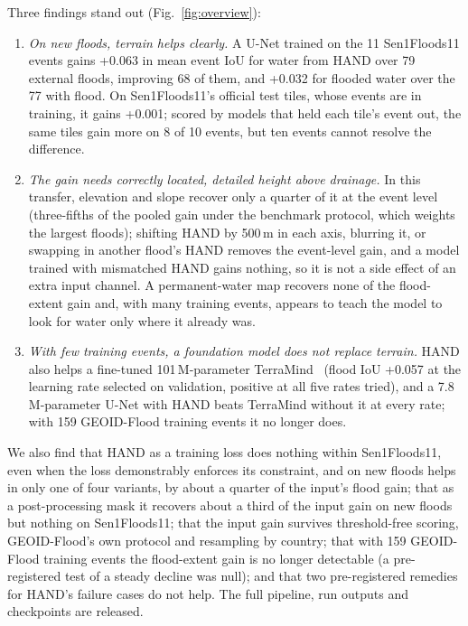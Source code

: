 Three findings stand out (Fig.~\ref{fig:overview}):
\begin{enumerate}
\item \emph{On new floods, terrain helps clearly.} A U-Net trained on the 11 Sen1Floods11 events gains
+0.063 in mean event IoU for water from HAND over 79 external floods, improving 68 of them, and +0.032 for
flooded water over the 77 with flood. On Sen1Floods11's official test tiles, whose events are in training,
it gains +0.001; scored by models that held each tile's event out, the same tiles gain more on 8 of 10
events, but ten events cannot resolve the difference.
\item \emph{The gain needs correctly located, detailed height above drainage.} In this transfer, elevation
and slope recover only a quarter of it at the event level (three-fifths of the pooled gain under the
benchmark protocol, which weights the largest floods); shifting HAND by 500\,m in each axis,
blurring it, or swapping in another flood's HAND removes the event-level gain, and a model trained with mismatched HAND gains nothing, so it
is not a side effect of an extra input channel. A permanent-water map recovers none of the flood-extent
gain and, with many training events, appears to teach the model to look for water only where it already was.
\item \emph{With few training events, a foundation model does not replace terrain.}
HAND also helps a fine-tuned 101\,M-parameter TerraMind~\cite{jakubik2025terramind} (flood IoU +0.057 at
the learning rate selected on validation, positive at all five rates tried), and a 7.8\,M-parameter U-Net
with HAND beats TerraMind without it at every rate; with 159 GEOID-Flood training events it no longer does.
\end{enumerate}

We also find that HAND as a training loss does nothing within Sen1Floods11, even when the loss
demonstrably enforces its constraint, and on new floods helps in only one of four variants, by about a quarter of
the input's flood gain; that as a post-processing mask it recovers about a third of the input gain on new
floods but nothing on Sen1Floods11; that the input gain survives threshold-free scoring, GEOID-Flood's own protocol
and resampling by country; that with 159 GEOID-Flood training events the flood-extent gain is no longer
detectable (a pre-registered test of a steady decline was null); and that two pre-registered remedies for
HAND's failure cases do not help. The full pipeline, run outputs and checkpoints are released.
